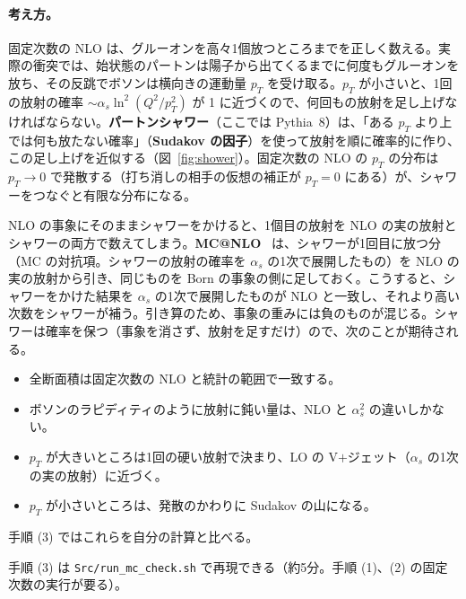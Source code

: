 \documentclass[a4paper,10pt]{ltjsarticle}
\begin{document}
\paragraph{考え方。}固定次数の NLO は、グルーオンを高々1個放つところまでを正しく数える。実際の衝突では、始状態のパートンは陽子から出てくるまでに何度もグルーオンを放ち、その反跳でボソンは横向きの運動量 $p_T$ を受け取る。$p_T$ が小さいと、1回の放射の確率 $\sim\alpha_s\ln^2(Q^2/p_T^2)$ が 1 に近づくので、何回もの放射を足し上げなければならない。\textbf{パートンシャワー}（ここでは Pythia~8）は、「ある $p_T$ より上では何も放たない確率」（\textbf{Sudakov の因子}）を使って放射を順に確率的に作り、この足し上げを近似する（図~\ref{fig:shower}）。固定次数の NLO の $p_T$ の分布は $p_T\to0$ で発散する（打ち消しの相手の仮想の補正が $p_T=0$ にある）が、シャワーをつなぐと有限な分布になる。

NLO の事象にそのままシャワーをかけると、1個目の放射を NLO の実の放射とシャワーの両方で数えてしまう。\textbf{MC@NLO}~\cite{mcatnlo} は、シャワーが1回目に放つ分（MC の対抗項。シャワーの放射の確率を $\alpha_s$ の1次で展開したもの）を NLO の実の放射から引き、同じものを Born の事象の側に足しておく。こうすると、シャワーをかけた結果を $\alpha_s$ の1次で展開したものが NLO と一致し、それより高い次数をシャワーが補う。引き算のため、事象の重みには負のものが混じる。シャワーは確率を保つ（事象を消さず、放射を足すだけ）ので、次のことが期待される。
\begin{itemize}
\item[(i)] 全断面積は固定次数の NLO と統計の範囲で一致する。
\item[(ii)] ボソンのラピディティのように放射に鈍い量は、NLO と $\alpha_s^2$ の違いしかない。
\item[(iii)] $p_T$ が大きいところは1回の硬い放射で決まり、LO の V$+$ジェット（$\alpha_s$ の1次の実の放射）に近づく。
\item[(iv)] $p_T$ が小さいところは、発散のかわりに Sudakov の山になる。
\end{itemize}
手順 (3) ではこれらを自分の計算と比べる。

手順 (3) は \texttt{Src/run\_mc\_check.sh} で再現できる（約5分。手順 (1)、(2) の固定次数の実行が要る）。
\end{document}
